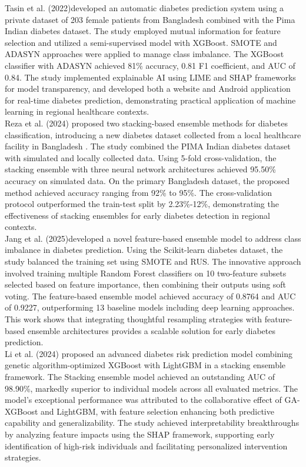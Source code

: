 \documentclass[conference, letterpaper]{IEEEtran}
\begin{document}
Tasin et al. (2022)developed an automatic diabetes prediction system using a private dataset of 203 female patients from Bangladesh combined with the Pima Indian diabetes dataset\cite{tasin2022diabetes}. The study employed mutual information for feature selection and utilized a semi-supervised model with XGBoost. SMOTE and ADASYN approaches were applied to manage class imbalance. The XGBoost classifier with ADASYN achieved 81\% accuracy, 0.81 F1 coefficient, and AUC of 0.84. The study implemented explainable AI using LIME and SHAP frameworks for model transparency, and developed both a website and Android application for real-time diabetes prediction, demonstrating practical application of machine learning in regional healthcare contexts.\\

Reza et al. (2024) proposed two stacking-based ensemble methods for diabetes classification, introducing a new diabetes dataset collected from a local healthcare facility in Bangladesh\cite{ensemblebangladesh} . The study combined the PIMA Indian diabetes dataset with simulated and locally collected data. Using 5-fold cross-validation, the stacking ensemble with three neural network architectures achieved 95.50\% accuracy on simulated data. On the primary Bangladesh dataset, the proposed method achieved accuracy ranging from 92\% to 95\%. The cross-validation protocol outperformed the train-test split by 2.23\%-12\%, demonstrating the effectiveness of stacking ensembles for early diabetes detection in regional contexts.\\

Jang et al. (2025)developed a novel feature-based ensemble model to address class imbalance in diabetes prediction\cite{jang2025feature}. Using the Scikit-learn diabetes dataset, the study balanced the training set using SMOTE and RUS. The innovative approach involved training multiple Random Forest classifiers on 10 two-feature subsets selected based on feature importance, then combining their outputs using soft voting. The feature-based ensemble model achieved accuracy of 0.8764 and AUC of 0.9227, outperforming 13 baseline models including deep learning approaches. This work shows that integrating thoughtful resampling strategies with feature-based ensemble architectures provides a scalable solution for early diabetes prediction.\\

Li et al. (2024) proposed an advanced diabetes risk prediction model combining genetic algorithm-optimized XGBoost with LightGBM in a stacking ensemble framework\cite{li2024diabetes}. The Stacking ensemble model achieved an outstanding AUC of 98.90\%, markedly superior to individual models across all evaluated metrics. The model's exceptional performance was attributed to the collaborative effect of GA-XGBoost and LightGBM, with feature selection enhancing both predictive capability and generalizability. The study achieved interpretability breakthroughs by analyzing feature impacts using the SHAP framework, supporting early identification of high-risk individuals and facilitating personalized intervention strategies.\\
\end{document}
